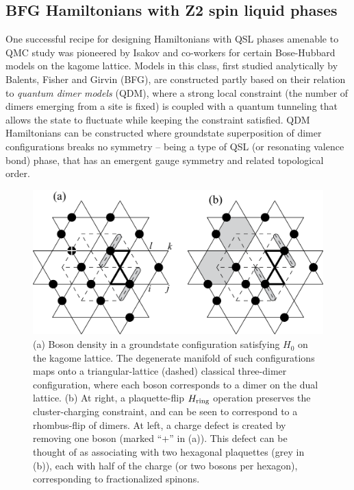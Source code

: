 \documentclass[range]{ar2e}
\begin{document}
\subsection{BFG Hamiltonians with Z2 spin liquid phases}


One successful recipe for designing Hamiltonians with QSL phases amenable to QMC study was pioneered by Isakov and co-workers \cite{Isakov1, Isakov2, TopoEE} for certain Bose-Hubbard models on the kagome lattice.  Models in this class, first studied analytically by Balents, Fisher and Girvin\cite{BFG} (BFG),
are constructed partly based on their relation to {\it quantum dimer models} (QDM), where a strong local constraint (the number of dimers emerging from a site is fixed) is coupled with a quantum tunneling that allows the state to fluctuate while keeping the constraint satisfied.  QDM Hamiltonians can be constructed where groundstate superposition of dimer configurations breaks no symmetry -- being a type of QSL (or resonating valence bond) phase, that has an emergent gauge symmetry and related topological order.


\begin{figure}
\includegraphics[width=6in]{kagome}
  \caption{ (a) Boson density in a groundstate configuration satisfying $H_0$ on the kagome lattice.  The degenerate manifold of such configurations maps onto a triangular-lattice (dashed) classical three-dimer configuration, where each boson corresponds to a dimer on the dual lattice.  (b) At right, a plaquette-flip $H_{\rm ring}$ operation preserves the cluster-charging constraint, and can be seen to correspond to a rhombus-flip of dimers.  At left, a charge defect is created by removing one boson (marked ``+'' in (a)).  This defect can be thought of as associating with two hexagonal plaquettes (grey in (b)), each with half of the charge (or two bosons per hexagon), corresponding to fractionalized spinons.} \label{kag_fig}
\end{figure}
\end{document}
